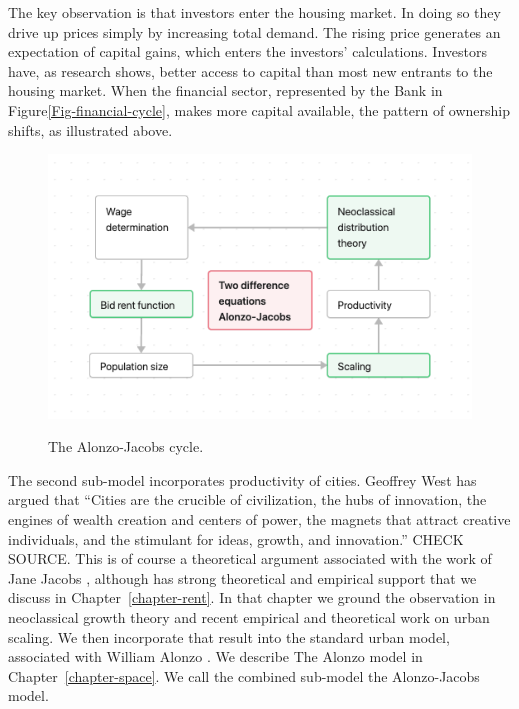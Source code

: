 The key observation is that investors enter the housing market. In doing so they drive up prices simply by increasing total demand. The rising price generates an expectation of capital gains, which enters the investors' calculations. Investors have, as research shows, better access to capital than most new entrants to the housing market. When the financial sector, represented by the Bank in Figure\ref{Fig-financial-cycle}, makes more capital available, the pattern of ownership shifts, as illustrated above.

\begin{figure}[!ht]
    \centering
    \includegraphics[scale=.7]{fig/flow_Alonzo-Jacobs_cycle.png}
    \label{Fig-Alonzo-jJacobs-cycle}
\caption{The Alonzo-Jacobs cycle.}
\end{figure}

The second sub-model incorporates  productivity of cities. Geoffrey West has argued that ``Cities are the crucible of civilization, the hubs of innovation, the engines of wealth creation and centers of power, the magnets that attract creative individuals, and the stimulant for ideas, growth, and innovation.'' \cite{westScaleUniversalLaws2017} CHECK SOURCE. This is of course a theoretical argument associated with the work of Jane Jacobs \cite{jacobsEconomyCities1969a}, although has strong theoretical and empirical support  \cite{bettencourtGrowthInnovationScaling2007, bettencourtOriginsScalingCities2013, dongUnderstandingMesoscopicScaling2020, loboUrbanScalingProduction2013} that we discuss in Chapter~\ref{chapter-rent}. In that chapter we ground the observation in  \gls{neoclassical growth theory} and recent empirical and theoretical work on \gls{urban scaling}. We then  incorporate that result into the standard urban model,  associated with William Alonzo \cite{alonzoTheoryUrbanLand1960}.   We describe The Alonzo model in Chapter~\ref{chapter-space}. We call the combined sub-model the \gls{Alonzo-Jacobs model}.   


